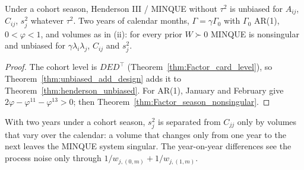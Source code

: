 \begin{theorem}\label{thm:Factor_season_unbiased}
  \leanok
  Under a cohort season, Henderson III / MINQUE without $\tau^2$ is unbiased for $A_{ij}$,
  $C_{ij}$, $s_j^2$ whatever $\tau^2$. Two years of calendar months, $\Gamma = \gamma\Gamma_0$
  with $\Gamma_0$ AR(1), $0 < \varphi < 1$, and volumes as in (ii): for every prior
  $W \succ 0$ MINQUE is nonsingular and unbiased for $\gamma\lambda_i\lambda_j$, $C_{ij}$ and
  $s_j^2$.
\end{theorem}
\begin{proof}
  \leanok
  The cohort level is $DED^\top$ (Theorem~\ref{thm:Factor_card_level}), so
  Theorem~\ref{thm:unbiased_add_design} adds it to Theorem~\ref{thm:henderson_unbiased}. For
  AR(1), January and February give $2\varphi - \varphi^{11} - \varphi^{13} > 0$; then
  Theorem~\ref{thm:Factor_season_nonsingular}.
\end{proof}

\begin{remark}[Finding 29]
  With two years under a cohort season, $s_j^2$ is separated from $C_{jj}$ only by volumes that
  vary over the calendar: a volume that changes only from one year to the next leaves the
  MINQUE system singular. The year-on-year differences see the process noise only through
  $1/w_{j,(0,m)} + 1/w_{j,(1,m)}$.
\end{remark}

